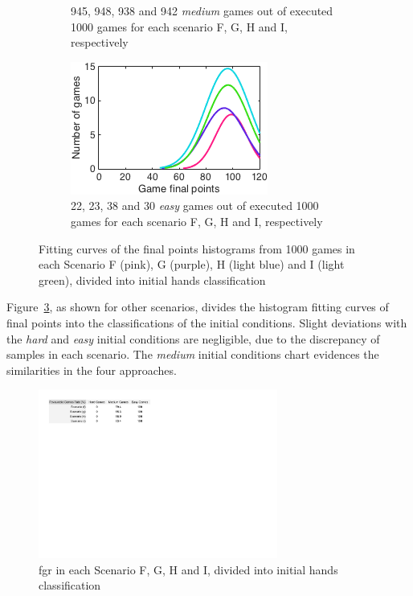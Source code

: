 \begin{figure}[h]
\begin{subfigure}[h]{0.32\textwidth}
                \caption{945, 948, 938 and 942 \emph{medium} games out of executed 1000 games for each scenario F, G, H and I, respectively}
                \label{fig:FGHImedium}
        \end{subfigure}
        \begin{subfigure}[h]{0.32\textwidth}
                \includegraphics[width=\textwidth]{./img/4/FGHIeasy}
                \caption{22, 23, 38 and 30 \emph{easy} games out of executed 1000 games for each scenario F, G, H and I, respectively}
                \label{fig:FGHIeasy}
        \end{subfigure}
        \caption{Fitting curves of the final points histograms from 1000 games in each Scenario F (pink), G (purple), H (light blue) and I (light green), divided into initial hands classification}
        \label{fig:FGHI-CH}
\end{figure}

Figure~\ref{fig:FGHI-CH}, as shown for other scenarios, divides the histogram fitting curves of final points into the classifications of the initial conditions.
Slight deviations with the \emph{hard} and \emph{easy} initial conditions are negligible, due to the discrepancy of samples in each scenario.
The \emph{medium} initial conditions chart evidences the similarities in the four approaches.

\begin{figure}[h!]
  \centering
    \includegraphics[width=0.7\textwidth]{./img/4/FGHI-fgr}
  \caption{\ac{fgr} in each Scenario F, G, H and I, divided into initial hands classification}
\label{fig:FGHI-fgr}
\end{figure}

